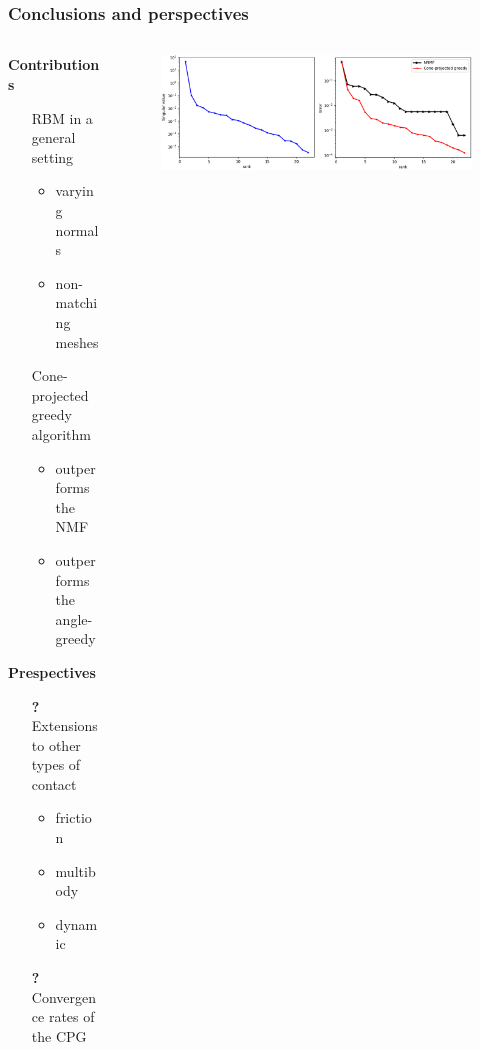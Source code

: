 \section{}
\begin{frame}\frametitle{Conclusions and perspectives}
	\label{lastframe}
	\medskip
	
	\begin{columns}
		\begin{column}{.6\textwidth}
			{\bfseries Contributions}
			\begin{itemize}
				\item[{\gr\bfseries \cmark}] RBM in a general setting
				\begin{itemize}
					\item varying normals
					\item non-matching meshes
				\end{itemize}
				\item[{\gr\bfseries \cmark}] Cone-projected greedy algorithm 
				\begin{itemize}
					\item outperforms the NMF
					\item outperforms the angle-greedy
				\end{itemize}
			\end{itemize}
			
			{\bfseries Prespectives}
			\begin{itemize} 
				\item[{\red\bfseries ?}] Extensions to other types of contact
				\begin{itemize} 
					\item friction 
					\item multibody 
					\item dynamic 
				\end{itemize}
				\item[{\red\bfseries ?}] Convergence rates of the CPG
			\end{itemize}
		\end{column}
		\hspace{-1.4cm}
		
		\begin{column}{.5\textwidth}
			\begin{figure}
				\includegraphics[trim=10.05cm 0cm 0cm 0cm, clip=true, width=.95\textwidth, angle=0]{./images/contact/sgv_nmf.png}
				\centering
			\end{figure}
		\end{column}
	\end{columns}
	

\end{frame}
